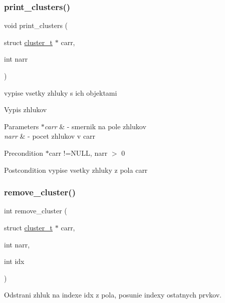 \subsubsection{\texorpdfstring{print\+\_\+clusters()}{print\_clusters()}}
{\footnotesize\ttfamily void print\+\_\+clusters (\begin{DoxyParamCaption}\item[{struct \hyperlink{structcluster__t}{cluster\+\_\+t} $\ast$}]{carr,  }\item[{int}]{narr }\end{DoxyParamCaption})}



vypise vsetky zhluky s ich objektami 

Vypis zhlukov 
\begin{DoxyParams}{Parameters}
{\em $\ast$carr} & -\/ smernik na pole zhlukov \\
\hline
{\em narr} & -\/ pocet zhlukov v carr \\
\hline
\end{DoxyParams}
\begin{DoxyPrecond}{Precondition}
$\ast$carr !=N\+U\+LL, narr $>$ 0 
\end{DoxyPrecond}
\begin{DoxyPostcond}{Postcondition}
vypise vsetky zhluky z pola carr 
\end{DoxyPostcond}
\hypertarget{group___praca_gaf73744f9128e4605127b40932a730a48}{}\label{group___praca_gaf73744f9128e4605127b40932a730a48} 
\subsubsection{\texorpdfstring{remove\+\_\+cluster()}{remove\_cluster()}}
{\footnotesize\ttfamily int remove\+\_\+cluster (\begin{DoxyParamCaption}\item[{struct \hyperlink{structcluster__t}{cluster\+\_\+t} $\ast$}]{carr,  }\item[{int}]{narr,  }\item[{int}]{idx }\end{DoxyParamCaption})}



Odstrani zhluk na indexe idx z pola, posunie indexy ostatnych prvkov. 

